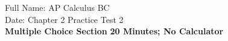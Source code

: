 \begin{questions}

    \horizontalline
\end{questions}

\newpage
{}

Full Name: \hfill AP Calculus BC \\[22pt]
Date: \hfill Chapter 2 Practice Test 2 \\[22pt]
\textbf{Multiple Choice Section} \hfill \textbf{20 Minutes; No Calculator} \\[11pt]

